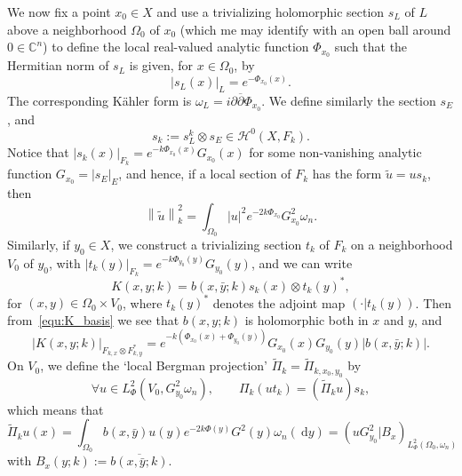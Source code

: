 \documentclass{article}
\newcommand{\abs}[1]{\left|#1\right|}
\newcommand{\norm}[1]{\left\|#1\right\|}
\newcommand{\lphi}{L^2_\Phi}
\newcommand{\dbar}{\overline\partial}
\newcommand{\DD}{\:\!\mathrm{d}}
\newcommand{\CM}{\mathbb{C}}
\newcommand{\pscal}[2]{\left(#1 | #2\right)}
\begin{document}
We now fix a point $x_0\in X$ and use a trivializing holomorphic
section $s_L$ of $L$ above a neighborhood $\Omega_0$ of $x_0$ (which
me may identify with an open ball around $0\in\CM^n$) to define the
local real-valued analytic function $ \Phi_{x_0}$ such that the
Hermitian norm of $s_L$ is given, for $x\in \Omega_0$, by
\begin{equation}
  \label{equ:Phi0}
  \abs{s_L(x)}_L = e^{-\Phi_{x_0}(x)}.
\end{equation}
The corresponding Kähler form is
$\omega_L=i\partial\dbar\Phi_{x_0}$. We define similarly the section
$s_E$, and
\begin{equation}
  \label{equ:trivialization-sk}
  s_k:=s_L^k\otimes s_E \in \mathcal{H}^0(X,F_k).
\end{equation}
Notice that $\abs{s_k(x)}_{F_k} = e^{-k\Phi_{x_0}(x)}G_{x_0}(x)$ for
some non-vanishing analytic function $G_{x_0}=\abs{s_E}_E$, and hence,
if a local section of $F_k$ has the form $\tilde u = u s_k$, then
\[
\norm{\tilde u}^2_{k} = \int_{\Omega_0}\abs{u}^2
e^{-2k\Phi_{x_0}}G_{x_0}^2 \omega_n.
\]
Similarly, if $y_0\in X$, we construct a trivializing section $t_k$ of
$F_k$ on a neighborhood $V_0$ of $y_0$, with
$\abs{t_k(y)}_{F_k} = e^{-k\Phi_{y_0}(y)}G_{y_0}(y)$, and we can write
\begin{equation}
  \label{equ:kernel-fibre}
  K(x,y;k) = b(x,\bar y;k) s_k(x)\otimes t_k(y)^*,
\end{equation}
for $(x,y)\in \Omega_0\times V_0$, where $t_k(y)^*$ denotes the
adjoint map $\pscal{\cdot}{t_k(y)}$. Then from~\eqref{equ:K_basis} we
see that $b(x,y;k)$ is holomorphic both in $x$ and $y$, and
\begin{equation}
  \label{equ:norm-K}
  \abs{K(x,y;k)}_{F_{k,x}\otimes F_{k,y}^*}  
  = e^{-k(\Phi_{x_0}(x) + \Phi_{y_0}(y))} G_{x_0}(x) G_{y_0}(y)\abs{b(x,\bar y;k)}.
\end{equation}
On $V_0$, we define the `local Bergman projection'
$\tilde \Pi_k=\tilde\Pi_{k,x_0,y_0}$ by
\[
\forall u \in \lphi(V_0,G_{y_0}^2\omega_n), \qquad \Pi_k (u t_k) =
(\tilde \Pi_k u) s_k,
\]
which means that
\begin{equation}
  \label{equ:Pi-tilde}
  \tilde \Pi_k u (x) = \int_{\Omega_0} b(x,\bar y) u(y) 
  e^{-2k\Phi(y)} G^2(y) \omega_n(\DD y) = 
  \pscal{u G_{y_0}^2}{B_x}_{\lphi(\Omega_0,\omega_n)}
\end{equation}
with $B_x(y;k):=\overline{b(x, \bar y;k)}$.
 
\end{document}
